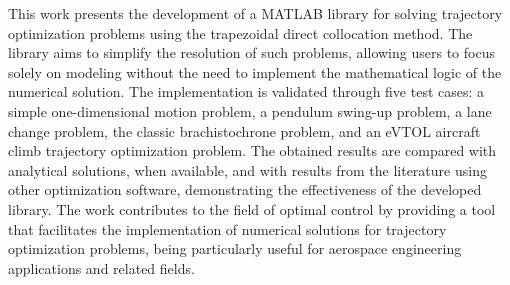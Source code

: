 This work presents the development of a MATLAB library for solving trajectory optimization problems using the trapezoidal direct collocation method. The library aims to simplify the resolution of such problems, allowing users to focus solely on modeling without the need to implement the mathematical logic of the numerical solution. The implementation is validated through five test cases: a simple one-dimensional motion problem, a pendulum swing-up problem, a lane change problem, the classic brachistochrone problem, and an eVTOL aircraft climb trajectory optimization problem. The obtained results are compared with analytical solutions, when available, and with results from the literature using other optimization software, demonstrating the effectiveness of the developed library. The work contributes to the field of optimal control by providing a tool that facilitates the implementation of numerical solutions for trajectory optimization problems, being particularly useful for aerospace engineering applications and related fields.